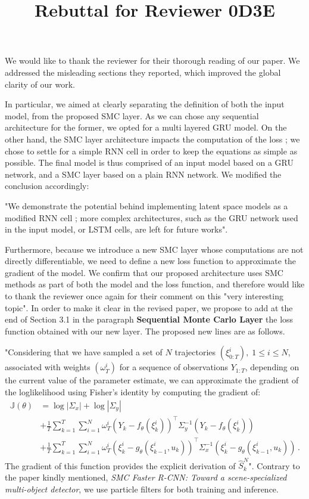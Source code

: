 \documentclass{article}
\title{Rebuttal for Reviewer 0D3E}
\date{}
\begin{document}

We would like to thank the reviewer for their thorough reading of our paper.
We addressed the misleading sections they reported, which improved the global clarity of our work.

In particular, we aimed at clearly separating the definition of both the input model, from the proposed SMC layer.
As we can chose any sequential architecture for the former, we opted for a multi layered GRU model.
On the other hand, the SMC layer architecture impacts the computation of the loss ; we chose to settle for a simple RNN cell in order to keep the equations as simple as possible.
The final model is thus comprised of an input model based on a GRU network, and a SMC layer based on a plain RNN network.
We modified the conclusion accordingly:

"We demonstrate the potential behind implementing latent space models as a modified RNN cell ; more complex architectures, such as the GRU network used in the input model, or LSTM cells, are left for future works".


Furthermore, because we introduce a new SMC layer whose computations are not directly differentiable, we need to define a new loss function to approximate the gradient of the model.
We confirm that our proposed architecture uses SMC methods as part of both the model and the loss function, and therefore would like to thank the reviewer once again for their comment on this "very interesting topic".
In order to make it clear in the revised paper, we propose to add at the end of Section 3.1 in the paragraph {\bf Sequential Monte Carlo Layer} the loss function obtained with our new layer. The proposed new lines are as follows.

"Considering that we have sampled a set of $N$ trajectories $(\xi^i_{0:T}),\;1 \leq i \leq N$, associated with weights $(\omega_T^i)$ for a sequence of observations $Y_{1:T}$, depending on the current value of the parameter estimate, we can approximate the gradient of the loglikelihood using Fisher's identity by computing the gradient of:
	\begin{align*}
		\mathbb{J}(\theta) & = \log |\Sigma_x| + \log |\Sigma_y|                                                                                                        \\
		                   & + \frac{1}{T}\sum_{k=1}^T \sum_{i=1}^N \omega_T^i (Y_k - f_\theta(\xi_k^i))^{\top} \Sigma_y^{-1} (Y_k - f_\theta(\xi_k^i))                         \\
		                   & + \frac{1}{T}\sum_{k=1}^T \sum_{i=1}^N \omega_T^i (\xi_k^i - g_\theta(\xi_{k-1}^i, u_k))^\top\Sigma_x^{-1}(\xi_k^i - g_\theta(\xi_{k-1}^i, u_k))\,.
	\end{align*}
The gradient of this function provides the explicit derivation of $\widehat{S}_k^N$".
Contrary to the paper kindly mentioned, \textit{SMC Faster R-CNN: Toward a scene-specialized multi-object detector}, we use particle filters for both training and inference.




\end{document}
